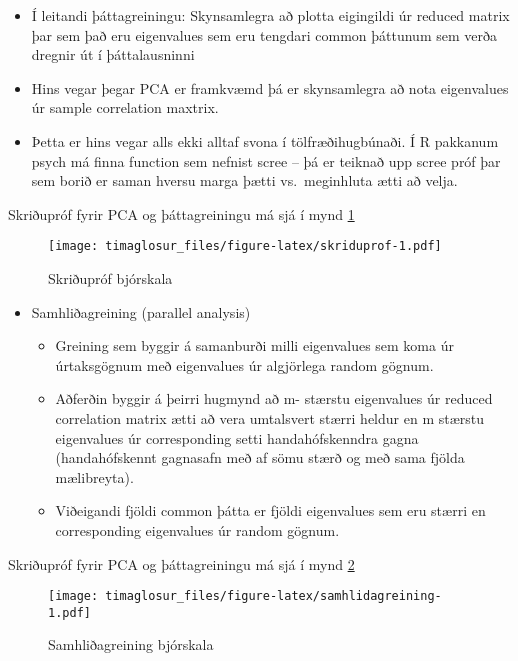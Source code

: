 \documentclass[]{book}
\providecommand{\tightlist}{%
  \setlength{\itemsep}{0pt}\setlength{\parskip}{0pt}}
\begin{document}
\begin{itemize}
\begin{itemize}
    \begin{itemize}
    \tightlist
    \item
      Í leitandi þáttagreiningu: Skynsamlegra að plotta eigingildi úr reduced matrix þar sem það eru
      eigenvalues sem eru tengdari common þáttunum sem verða dregnir út í þáttalausninni
    \item
      Hins vegar þegar PCA er framkvæmd þá er skynsamlegra að nota eigenvalues úr sample correlation
      maxtrix.
    \item
      Þetta er hins vegar alls ekki alltaf svona í tölfræðihugbúnaði. Í R pakkanum psych má finna
      function sem nefnist scree -- þá er teiknað upp scree próf þar sem borið er saman hversu marga
      þætti vs.~meginhluta ætti að velja.
    \end{itemize}
  \end{itemize}
\end{itemize}

Skriðupróf fyrir PCA og þáttagreiningu má sjá í mynd \ref{fig:skriduprof}

\begin{figure}
\centering
\texttt{[image: timaglosur\_files/figure-latex/skriduprof-1.pdf]}
\caption{\label{fig:skriduprof}Skriðupróf bjórskala}
\end{figure}

\begin{itemize}
\tightlist
\item
  Samhliðagreining (parallel analysis)

  \begin{itemize}
  \tightlist
  \item
    Greining sem byggir á samanburði milli eigenvalues sem koma úr úrtaksgögnum með eigenvalues úr algjörlega random gögnum.
  \item
    Aðferðin byggir á þeirri hugmynd að m- stærstu eigenvalues úr reduced correlation matrix ætti að vera umtalsvert stærri heldur en m stærstu eigenvalues úr corresponding setti handahófskenndra gagna (handahófskennt gagnasafn með af sömu stærð og með sama fjölda mælibreyta).
  \item
    Viðeigandi fjöldi common þátta er fjöldi eigenvalues sem eru stærri en corresponding eigenvalues úr random gögnum.
  \end{itemize}
\end{itemize}

Skriðupróf fyrir PCA og þáttagreiningu má sjá í mynd \ref{fig:samhlidagreining}

\begin{figure}
\centering
\texttt{[image: timaglosur\_files/figure-latex/samhlidagreining-1.pdf]}
\caption{\label{fig:samhlidagreining}Samhliðagreining bjórskala}
\end{figure}
\end{document}
